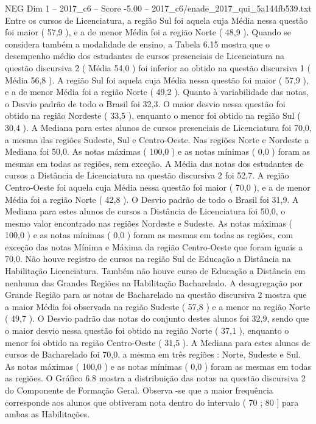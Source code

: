 \begin{textsample}{NEG Dim 1 – 2017\_c6 – Score -5.00 – 2017\_c6/enade\_2017\_qui\_5a144fb539.txt}
Entre os cursos de Licenciatura, a região Sul foi aquela cuja Média nessa questão foi maior ( 57,9 ), e a de menor Média foi a região Norte ( 48,9 ).
Quando se considera também a modalidade de ensino, a Tabela 6.15 mostra que o desempenho médio dos estudantes de cursos presenciais de Licenciatura na questão discursiva 2 ( Média 54,0 ) foi inferior ao obtido na questão discursiva 1 ( Média 56,8 ).
A região Sul foi aquela cuja Média nessa questão foi maior ( 57,9 ), e a de menor Média foi a região Norte ( 49,2 ).
Quanto à variabilidade das notas, o Desvio padrão de todo o Brasil foi 32,3.
O maior desvio nessa questão foi obtido na região Nordeste ( 33,5 ), enquanto o menor foi obtido na região Sul ( 30,4 ).
A Mediana para estes alunos de cursos presenciais de Licenciatura foi 70,0, a mesma das regiões Sudeste, Sul e Centro-Oeste.
Nas regiões Norte e Nordeste a Mediana foi 50,0.
As notas máximas ( 100,0 ) e as notas mínimas ( 0,0 ) foram as mesmas em todas as regiões, sem exceção.
A Média das notas dos estudantes de cursos a Distância de Licenciatura na questão discursiva 2 foi 52,7.
A região Centro-Oeste foi aquela cuja Média nessa questão foi maior ( 70,0 ), e a de menor Média foi a região Norte ( 42,8 ).
O Desvio padrão de todo o Brasil foi 31,9.
A Mediana para estes alunos de cursos a Distância de Licenciatura foi 50,0, o mesmo valor encontrado nas regiões Nordeste e Sudeste.
As notas máximas ( 100,0 ) e as notas mínimas ( 0,0 ) foram as mesmas em todas as regiões, com exceção das notas Mínima e Máxima da região Centro-Oeste que foram iguais a 70,0.
Não houve registro de cursos na região Sul de Educação a Distância na Habilitação Licenciatura.
Também não houve curso de Educação a Distância em nenhuma das Grandes Regiões na Habilitação Bacharelado.
A desagregação por Grande Região para as notas de Bacharelado na questão discursiva 2 mostra que a maior Média foi observada na região Sudeste ( 57,8 ) e a menor na região Norte ( 49,7 ).
O Desvio padrão das notas do conjunto destes alunos foi 32,9, sendo que o maior desvio nessa questão foi obtido na região Norte ( 37,1 ), enquanto o menor foi obtido na região Centro-Oeste ( 31,5 ).
A Mediana para estes alunos de cursos de Bacharelado foi 70,0, a mesma em três regiões : Norte, Sudeste e Sul.
As notas máximas ( 100,0 ) e as notas mínimas ( 0,0 ) foram as mesmas em todas as regiões.
O Gráfico 6.8 mostra a distribuição das notas na questão discursiva 2 do Componente de Formação Geral.
Observa -se que a maior frequência corresponde aos alunos que obtiveram nota dentro do intervalo ( 70 ; 80 ] para ambas as Habilitações.

\end{textsample}
